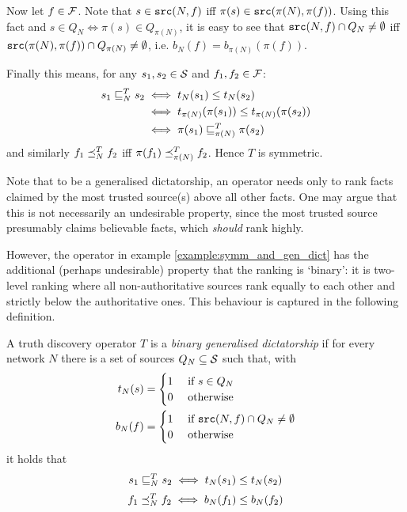 \documentclass[../main.tex]{subfiles}
\begin{document}
\begin{example}
Now let $f \in \F$. Note that $s \in \src(N, f)$ iff $\pi(s) \in \src(\pi(N),
\pi(f))$. Using this fact and $s \in Q_N \iff \pi(s) \in Q_{\pi(N)}$, it is
easy to see that $\src(N, f) \cap Q_N \ne \emptyset$ iff $\src(\pi(N), \pi(f))
\cap Q_{\pi(N)} \ne \emptyset$, i.e. $b_N(f) = b_{\pi(N)}(\pi(f))$.

Finally this means, for any $s_1, s_2 \in \S$ and $f_1, f_2 \in \F$:
\begin{align*}
    s_1 \sle_N^T s_2 & \iff t_N(s_1) \le t_N(s_2) \\
                     & \iff t_{\pi(N)}(\pi(s_1)) \le t_{\pi(N)}(\pi(s_2)) \\
                     & \iff \pi(s_1) \sle_{\pi(N)}^T \pi(s_2)
\end{align*}
and similarly $f_1 \fle_N^T f_2$ iff $\pi(f_1) \fle_{\pi(N)}^T f_2$. Hence $T$
is symmetric.
\end{example}

Note that to be a generalised dictatorship, an operator needs only to rank
facts claimed by the most trusted source(s) above all other facts. One may
argue that this is not necessarily an undesirable property, since the most
trusted source presumably claims believable facts, which \emph{should} rank
highly.

However, the operator in example \ref{example:symm_and_gen_dict} has the
additional (perhaps undesirable) property that the ranking is `binary': it is
two-level ranking where all non-authoritative sources rank equally to each
other and strictly below the authoritative ones. This behaviour is captured in
the following definition.

\begin{definition}
A truth discovery operator $T$ is a \emph{binary generalised dictatorship} if
for every network $N$ there is a set of sources $Q_N \subseteq \S$ such that,
with
\begin{align*}
    t_N(s) & = \begin{cases}
        1 & \text{ if } s \in Q_N \\
        0 & \text{ otherwise}
    \end{cases} \\
    b_N(f) & = \begin{cases}
        1 & \text{ if } \src(N, f) \cap Q_N \ne \emptyset \\
        0 & \text{ otherwise}
    \end{cases}
\end{align*}
it holds that
\[ s_1 \sle_N^T s_2 \iff t_N(s_1) \le t_N(s_2) \]
\[ f_1 \fle_N^T f_2 \iff b_N(f_1) \le b_N(f_2) \]

\end{definition}
\end{document}
